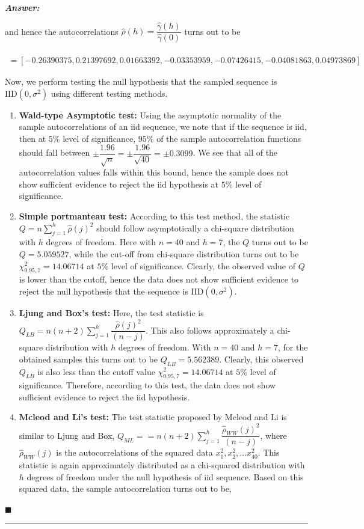 \documentclass[12pt]{article}
\theoremstyle{definition}
\newenvironment{answer}{
    \textbf{\textit{Answer:}} \qquad
}{\hfill $\blacksquare$ \\ \begin{center}
    \rule{0.6\linewidth}{0.5px}    
\end{center}
}
\begin{document}
\begin{answer}
    and hence the autocorrelations $\widehat{\rho}(h) = \dfrac{\widehat{\gamma}(h)}{\widehat{\gamma}(0)}$ turns out to be

    \begin{multline*}
        [\widehat{\rho}(1), \ldots, \widehat{\rho}(7)]\\
        = [-0.26390375,  0.21397692,  0.01663392, -0.03353959, -0.07426415, -0.04081863, 0.04973869]
    \end{multline*}

    Now, we perform testing the null hypothesis that the sampled sequence is $\text{IID}(0, \sigma^2)$ using different testing methods.
    \begin{enumerate}
        \item \textbf{Wald-type Asymptotic test:} Using the asymptotic normality of the sample autocorrelations of an iid sequence, we note that if the sequence is iid, then at $5\%$ level of significance, $95\%$ of the sample autocorrelation functions should fall between $\pm \dfrac{1.96}{\sqrt{n}} = \pm \dfrac{1.96}{\sqrt{40}} = \pm 0.3099$. We see that all of the autocorrelation values falls within this bound, hence the sample does not show sufficient evidence to reject the iid hypothesis at $5\%$ level of significance.
        \item \textbf{Simple portmanteau test:} According to this test method, the statistic $Q = n \sum_{j = 1}^h \widehat{\rho}(j)^2$ should follow asymptotically a chi-square distribution with $h$ degrees of freedom. Here with $n  = 40$ and $h = 7$, the $Q$ turns out to be $Q = 5.059527$, while the cut-off from chi-square distribution turns out to be $\chi^2_{0.95, 7} = 14.06714$ at $5\%$ level of significance. Clearly, the observed value of $Q$ is lower than the cutoff, hence the data does not show sufficient evidence to reject the null hypothesis that the sequence is $\text{IID}(0, \sigma^2)$.
        \item \textbf{Ljung and Box's test:} Here, the test statistic is $Q_{LB} = n(n+2) \sum_{j = 1}^h \dfrac{\widehat{\rho}(j)^2}{(n - j)}$. This also follows approximately a chi-square distribution with $h$ degrees of freedom. With $n = 40$ and $h = 7$, for the obtained samples this turns out to be $Q_{LB} = 5.562389$. Clearly, this observed $Q_{LB}$ is also less than the cutoff value $\chi^2_{0.95, 7} = 14.06714$ at $5\%$ level of significance. Therefore, according to this test, the data does not show sufficient evidence to reject the iid hypothesis.
        \item \textbf{Mcleod and Li's test:} The test statistic proposed by Mcleod and Li is similar to Ljung and Box, $Q_{ML} = = n(n+2) \sum_{j = 1}^h \dfrac{\widehat{\rho}_{WW}(j)^2}{(n - j)}$, where $\widehat{\rho}_{WW}(j)$ is the autocorrelations of the squared data $x_1^2, x_2^2, \dots x_{40}^2$. This statistic is again approximately distributed as a chi-squared distribution with $h$ degrees of freedom under the null hypothesis of iid sequence. Based on this squared data, the sample autocorrelation turns out to be,
        

\end{enumerate}
\end{answer}
\end{document}
